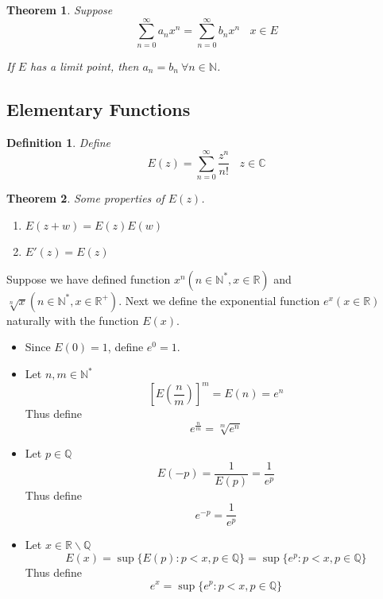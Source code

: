 \documentclass[aps,pra,onecolumn,notitlepage,superscriptaddress]{revtex4-1}
\newcommand{\N}{\mathbb{N}}
\newcommand{\R}{\mathbb{R}}
\newcommand{\C}{\mathbb{C}}
\newcommand{\Q}{\mathbb{Q}}
\newtheorem{theo}{Theorem}
\newtheorem{defi}{Definition}
\begin{document}
    \begin{theo}
        Suppose
        \begin{equation}
            \sum_{n=0}^\infty a_n x^n = \sum_{n=0}^\infty b_n x^n \ \ \ \ x \in E
        \end{equation}

        If $E$ has a limit point, then $a_n = b_n \ \forall n \in \N$.
    \end{theo}

    \subsection{Elementary Functions}
    \begin{defi}
        Define 
        \begin{equation}
            E(z) = \sum_{n=0}^{\infty} \frac{z^n}{n!} \ \ \ \ z \in \C
        \end{equation}
    \end{defi}
    \begin{theo}
        Some properties of $E(z)$.
        \begin{enumerate}
            \item $E(z+w) = E(z)E(w)$
            \item $E'(z) = E(z)$
        \end{enumerate}
    \end{theo}

    Suppose we have defined function $x^n (n \in \N^*, x \in \R)$ and $\sqrt[n]{x} (n \in \N^*, x \in \R^+)$. Next we define the exponential function $e^x (x \in \R)$ naturally with the function $E(x)$.
    \begin{itemize}
        \item Since $E(0) = 1$, define $e^0 = 1$.
        \item Let $n,m \in \N^*$
        \begin{equation}
            \left[E \left(\frac{n}{m}\right) \right]^m = E(n) = e^n
        \end{equation}
        Thus define
        \begin{equation}
            e^{\frac{n}{m}} = \sqrt[m]{e^n}
        \end{equation}
        \item Let $p \in \Q$
        \begin{equation}
            E(-p) = \frac{1}{E(p)} = \frac{1}{e^p}
        \end{equation}
        Thus define
        \begin{equation}
            e^{-p} = \frac{1}{e^p}
        \end{equation}
        \item Let $x \in \R \backslash \Q$
        \begin{equation}
            E(x) = \sup \{E(p) : p < x, p \in \Q \} = \sup \{e^p : p < x, p \in \Q \}
        \end{equation}
        Thus define
        \begin{equation}
            e^x = \sup \{e^p : p < x, p \in \Q \}
        \end{equation}
    \end{itemize}
\end{document}
